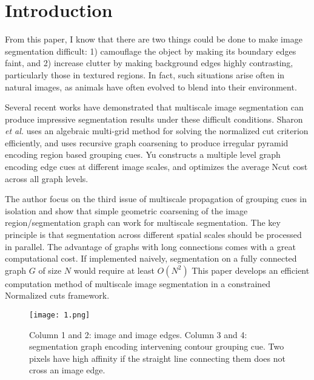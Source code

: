 \documentclass[10pt,twocolumn,letterpaper]{article}
\begin{document}
\section{Introduction}
From this paper, I know that there are two things could be done to make image segmentation difficult: 1) camouflage the object by making its boundary edges faint, and 2) increase clutter by making background edges highly contrasting, particularly those in textured regions. In fact, such situations arise often in natural images, as animals have often evolved to blend into their environment.
\par
Several recent works have demonstrated that multiscale image segmentation can produce impressive segmentation results under these difficult conditions.  Sharon \emph{et al.}\cite{Sharon2000Fast} uses an algebraic multi-grid method for solving the normalized cut criterion efficiently, and uses recursive graph coarsening to produce irregular pyramid encoding region based grouping cues. Yu\cite{Yu2004Segmentation} constructs a multiple level graph encoding edge cues at different image scales, and optimizes the average Ncut cost across all graph levels.
\par
The author focus on the third issue of multiscale propagation of grouping cues in isolation and show that simple geometric
coarsening of the image region/segmentation graph can work for multiscale segmentation\cite{Yu2001Grouping}. The key principle is that segmentation across different spatial scales should be processed in parallel. The advantage of graphs with long connections comes with a great computational cost. If implemented naively, segmentation on a fully connected graph $G$ of size $N$ would
require at least $O(N^2)$ This paper develops an efficient computation method of multiscale image segmentation in a constrained Normalized cuts framework\cite{Girshick2016Region}.
\begin{figure}
\begin{center}
  \texttt{[image: 1.png]}\\
  \caption{Column 1 and 2: image and image edges. Column 3 and 4: segmentation graph encoding intervening contour grouping cue. Two pixels have high affinity if the straight line connecting them does not cross an image edge. }\label{1}
\end{center}
\end{figure}
\end{document}
